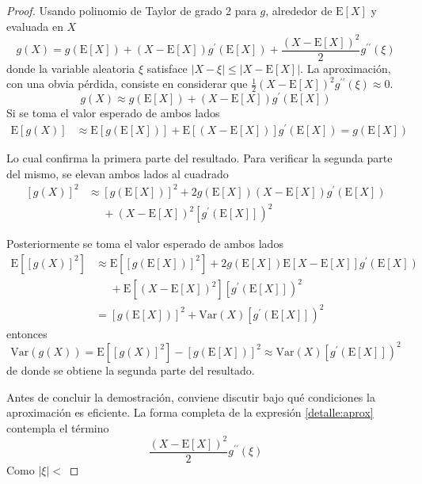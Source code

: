 \documentclass[12pt,letterpaper,draft]{book}
\newcommand{\prima}{^{\prime}}
\newcommand{\E}[1]{\mathrm{E}\left[ #1 \right]}
\newcommand{\Var}[1]{\mathrm{Var}\left( #1 \right)}
\newcommand{\abso}[1]{\left| #1 \right|}
\newcommand{\pheq}{\phantom{=}}
\begin{document}
\begin{proof}
Usando polinomio de Taylor de grado 2 para $g$, alrededor de $\E{X}$ y evaluada en $X$
\begin{equation}
g(X) = g\left( \E{X} \right) + \left(X - \E{X} \right) g\prima \left( \E{X} \right) + \frac{\left( X - \E{X} \right)^{2}}{2} g^{\prime \prime}(\xi)
\label{detalle:aprox}
\end{equation}
donde la variable aleatoria $\xi$ satisface $\abso{X-\xi} \leq \abso{X - \E{X}}$.
%
La aproximación, con una obvia pérdida, consiste en considerar que $\frac{1}{2}\left( X - \E{X} \right)^{2} g^{\prime \prime}(\xi) \approx 0$.
\begin{equation}
g(X) \approx g\left( \E{X} \right) + \left(X - \E{X} \right) g\prima \left( \E{X} \right)
\end{equation}
Si se toma el valor esperado de ambos lados
\begin{align}
\E{g(X)} &\approx \E{g\left( \E{X} \right)} + \E{\left(X - \E{X} \right)} g\prima \left( \E{X} \right) = g\left( \E{X} \right)
\end{align}

Lo cual confirma la primera parte del resultado. Para verificar la segunda parte del mismo, se elevan ambos lados al cuadrado
\begin{align}
\left[g(X)\right]^{2} &\approx \left[g\left( \E{X} \right)\right]^{2} + 2 g\left( \E{X} \right) \left(X - \E{X} \right) g\prima \left( \E{X} \right) \nonumber \\
&\pheq + \left(X - \E{X} \right)^{2} \left[ g\prima \left( \E{X} \right] \right)^{2}
\end{align}

Posteriormente se toma el valor esperado de ambos lados
\begin{align*}
\E{\left[g(X)\right]^{2}} &\approx \E{\left[g\left( \E{X} \right)\right]^{2}} + 2 g\left( \E{X} \right) \E{X - \E{X} } g\prima \left( \E{X} \right) \nonumber \\
&\pheq + \E{\left(X - \E{X} \right)^{2}} \left[ g\prima \left( \E{X} \right] \right)^{2} \\
&= \left[g\left( \E{X} \right)\right]^{2} + \Var{X} \left[ g\prima \left( \E{X} \right] \right)^{2}
\end{align*}
entonces
\begin{equation}
\Var{g(X)} = \E{\left[g(X)\right]^{2}} - \left[g\left( \E{X} \right)\right]^{2} \approx \Var{X} \left[ g\prima \left( \E{X} \right] \right)^{2}
\end{equation}
de donde se obtiene la segunda parte del resultado. 

Antes de concluir la demostración, conviene discutir bajo qué condiciones la aproximación es eficiente. La forma completa de la expresión \ref{detalle:aprox} contempla el término
\begin{equation}
\frac{\left( X - \E{X} \right)^{2}}{2} g^{\prime \prime}(\xi)
\end{equation}
Como $\abso{\xi} < $
\end{proof}
\end{document}
